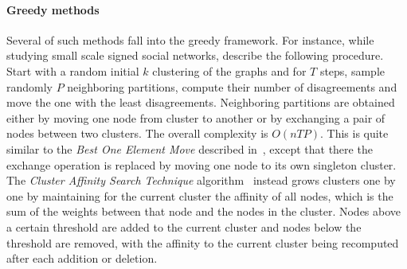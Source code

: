 \paragraph{Greedy methods}
\label{par:cc_greedy}
Several of such methods fall into the greedy framework.
For instance, while studying small scale signed social networks,
\textcite{Early96} describe the following procedure. Start with a random initial $k$ clustering of
the graphs and for $T$ steps, sample randomly $P$ neighboring partitions, compute their number of
disagreements and move the one with the least disagreements. Neighboring partitions are obtained
either by moving one node from cluster to another or by exchanging a pair of nodes between two
clusters. The overall complexity is $O(nTP)$. This is quite similar to the \emph{Best One Element
Move} described in~\autocite{Gionis2007}, except that there the exchange operation is replaced by moving
one node to its own singleton cluster. The \emph{Cluster Affinity Search Technique}
algorithm~\autocite{Ben-Dor99} instead grows clusters one by one by maintaining for the current
cluster the affinity of all nodes, which is the sum of the weights between that node and the nodes in
the cluster. Nodes above a certain threshold are added to the current cluster and nodes below the
threshold are removed, with the affinity to the current cluster being recomputed after each addition
or deletion.

